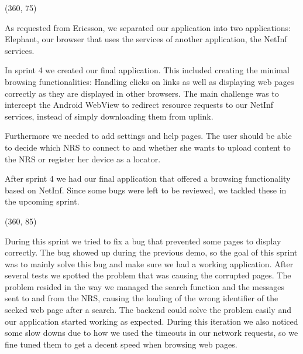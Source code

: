 \framebox(360, 75){
}

As requested from Ericsson, we separated our application into two
applications: Elephant, our browser that uses the services of another application,
the NetInf services. 

In sprint 4 we created our final application. This included
creating the minimal browsing functionalities: Handling clicks on links
as well as displaying web pages correctly as they are displayed in
other browsers. The main challenge was to intercept the Android WebView
to redirect resource requests to our NetInf services, instead of simply
downloading them from uplink.

Furthermore we needed to add settings and help pages. The user should
be able to decide which NRS to connect to and whether she wants to upload content to the NRS or
register her device as a locator.

After sprint 4 we had our final application that offered a browsing functionality
based on NetInf. Since some bugs were left to be reviewed, we tackled these
in the upcoming sprint.


\framebox(360, 85){
}


During this sprint we tried to fix a bug that prevented some pages to display correctly.
The bug showed up during the previous demo, so the goal of this sprint was to mainly
solve this bug and make sure we had a working application. After several tests we spotted the problem that was causing
the corrupted pages. The problem resided in the way we managed the search function and the messages sent to and from the NRS,
causing the loading of the wrong identifier of the seeked web page after a search. The backend could solve the problem easily and our application
started working as expected. During this iteration we also noticed some slow downs due to how we used the timeouts
in our network requests, so we fine tuned them to get a decent speed when browsing web pages.


